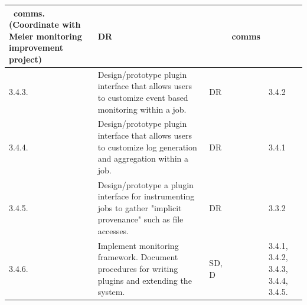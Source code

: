 \begin{longtable}{|p{1cm}|p{10.2cm}|p{1cm}|p{1cm}|p{1.8cm}|}
	  \ngrm\ comms.  (Coordinate with Meier monitoring improvement project)
        & DR
        &
        & comms \\
  \hline
  3.4.3.& Design/prototype plugin interface that allows
          users to customize event based monitoring within a job.
        & DR
        &
        & 3.4.2 \\
  \hline
  3.4.4.& Design/prototype plugin interface that allows
          users to customize log generation and aggregation within a job.
        & DR
        & 
        & 3.4.1 \\
  \hline
  3.4.5.& Design/prototype a plugin interface for instrumenting jobs
          to gather "implicit provenance" such as file accesses.
        & DR
        & 
        & 3.3.2 \\
  \hline
  3.4.6.& Implement monitoring framework.
          Document procedures for writing plugins and extending the system.
        & SD, D
        &
        & 3.4.1, 3.4.2, 3.4.3, 3.4.4, 3.4.5. \\
  \hline
\end{longtable}



